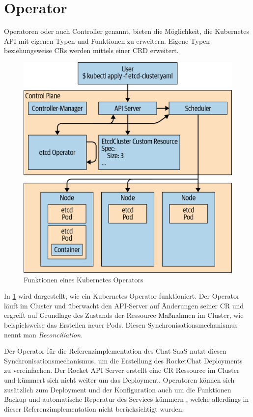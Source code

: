 \section{Operator}
\label{sec:komponenten:operator}

Operatoren oder auch Controller genannt, bieten die Möglichkeit, die Kubernetes API mit eigenen Typen und Funktionen zu erweitern.
Eigene Typen beziehungsweise \acp{CR} werden mittels einer \ac{CRD} erweitert.
\begin{figure}[h]
  \centering
  \includegraphics{gfx/chapters/3_komponenten/operator_example.png}
  \caption{Funktionen eines Kubernetes Operators}
  \label{fig:kubernetes_operator_example}
\end{figure}

In \ref{fig:kubernetes_operator_example} wird dargestellt, wie ein Kubernetes Operator funktioniert. Der Operator läuft im Cluster und
überwacht den API-Server auf Änderungen seiner \ac{CR} und ergreift auf Grundlage des Zustands der Ressource Maßnahmen im Cluster, 
wie beispielsweise das Erstellen neuer Pods. \cite{Dobies2020}
Diesen Synchronisationsmechanismus nennt man \emph{Reconciliation}.

Der Operator für die Referenzimplementation des Chat \ac{SaaS} nutzt diesen Synchronisationsmechanismus, um die Erstellung des RocketChat
Deployments zu vereinfachen. Der Rocket API Server erstellt eine \ac{CR} Ressource im Cluster und kümmert sich nicht weiter um 
das Deployment. Operatoren können sich zusätzlich zum Deployment und der Konfiguration auch um die Funktionen Backup 
und automatische Reperatur des Services kümmern \cite{Dobies2020}, welche allerdings in dieser Referenzimplementation 
nicht berücksichtigt wurden.

